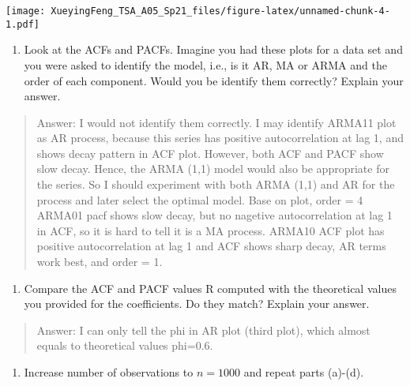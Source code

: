 \documentclass[
]{article}
\providecommand{\tightlist}{%
  \setlength{\itemsep}{0pt}\setlength{\parskip}{0pt}}
\begin{document}
\texttt{[image: XueyingFeng\_TSA\_A05\_Sp21\_files/figure-latex/unnamed-chunk-4-1.pdf]}

\begin{enumerate}
\def\labelenumi{(\alph{enumi})}
\setcounter{enumi}{2}
\tightlist
\item
  Look at the ACFs and PACFs. Imagine you had these plots for a data set
  and you were asked to identify the model, i.e., is it AR, MA or ARMA
  and the order of each component. Would you be identify them correctly?
  Explain your answer.
\end{enumerate}

\begin{quote}
Answer: I would not identify them correctly. I may identify ARMA11 plot
as AR process, because this series has positive autocorrelation at lag
1, and shows decay pattern in ACF plot. However, both ACF and PACF show
slow decay. Hence, the ARMA (1,1) model would also be appropriate for
the series. So I should experiment with both ARMA (1,1) and AR for the
process and later select the optimal model. Base on plot, order = 4
ARMA01 pacf shows slow decay, but no nagetive autocorrelation at lag 1
in ACF, so it is hard to tell it is a MA process. ARMA10 ACF plot has
positive autocorrelation at lag 1 and ACF shows sharp decay, AR terms
work best, and order = 1.
\end{quote}

\begin{enumerate}
\def\labelenumi{(\alph{enumi})}
\setcounter{enumi}{3}
\tightlist
\item
  Compare the ACF and PACF values R computed with the theoretical values
  you provided for the coefficients. Do they match? Explain your answer.
\end{enumerate}

\begin{quote}
Answer: I can only tell the phi in AR plot (third plot), which almost
equals to theoretical values phi=0.6.
\end{quote}

\begin{enumerate}
\def\labelenumi{(\alph{enumi})}
\setcounter{enumi}{4}
\tightlist
\item
  Increase number of observations to \(n=1000\) and repeat parts
  (a)-(d).
\end{enumerate}
\end{document}

